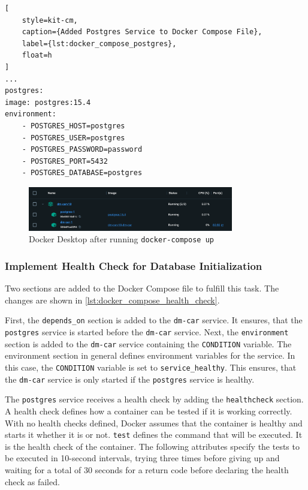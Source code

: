 \begin{lstlisting}[
    style=kit-cm,
    caption={Added Postgres Service to Docker Compose File},
    label={lst:docker_compose_postgres},
    float=h
]
...
postgres:
image: postgres:15.4
environment:
    - POSTGRES_HOST=postgres
    - POSTGRES_USER=postgres
    - POSTGRES_PASSWORD=password
    - POSTGRES_PORT=5432
    - POSTGRES_DATABASE=postgres
\end{lstlisting}

\begin{figure}
    \centering
    \includegraphics[width=0.8\textwidth]{figures/microservices/dmCar/ms_dmCar_dockerComposePostgres.png}
    \caption{Docker Desktop after running \texttt{docker-compose up}}
    \label{fig:docker_compose_up}
\end{figure}

\subsubsection*{Implement Health Check for Database Initialization}
Two sections are added to the Docker Compose file to fulfill this task.
The changes are shown in \autoref*{lst:docker_compose_health_check}.

First, the \texttt{depends\_on} section is added to the \texttt{dm-car} service.
It ensures, that the \texttt{postgres} service is started before the \texttt{dm-car} service.
Next, the \texttt{environment} section is added to the \texttt{dm-car} service containing the \texttt{CONDITION} variable.
The environment section in general defines environment variables for the service.
In this case, the \texttt{CONDITION} variable is set to \texttt{service\_healthy}.
This ensures, that the \texttt{dm-car} service is only started if the \texttt{postgres} service is healthy.

The \texttt{postgres} service receives a health check by adding the \texttt{healthcheck} section.
A health check defines how a container can be tested if it is working correctly.
With no health checks defined, Docker assumes that the container is healthy and starts it whether it is or not.
\texttt{test} defines the command that will be executed.
It is the health check of the container.
The following attributes specify the tests to be executed in 10-second intervals, trying three times before giving up and waiting for a total of 30 seconds for a return code before declaring the health check as failed.


